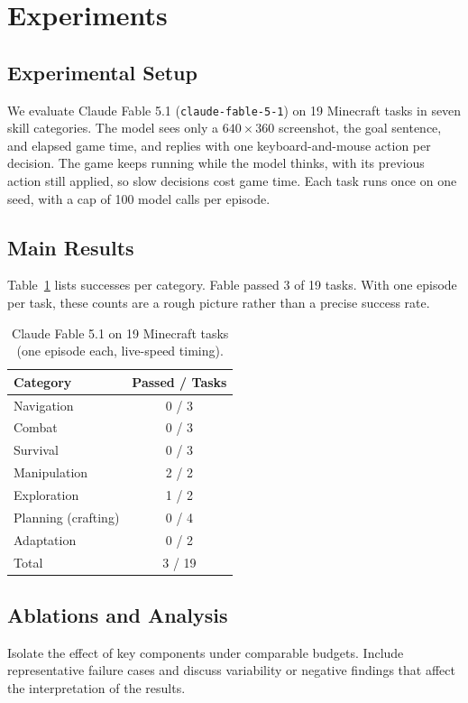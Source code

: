 \section{Experiments}
\label{sec:experiments}
\subsection{Experimental Setup}
We evaluate Claude Fable 5.1 (\texttt{claude-fable-5-1}) on 19 Minecraft
tasks in seven skill categories. The model sees only a $640\times360$
screenshot, the goal sentence, and elapsed game time, and replies with one
keyboard-and-mouse action per decision. The game keeps running while the
model thinks, with its previous action still applied, so slow decisions
cost game time. Each task runs once on one seed, with a cap of 100 model
calls per episode.

\subsection{Main Results}
Table~\ref{tab:results} lists successes per category. Fable passed
3 of 19 tasks. With one episode per task, these counts are a rough
picture rather than a precise success rate.

\begin{table}[t]
  \centering
  \caption{Claude Fable 5.1 on 19 Minecraft tasks (one episode each,
  live-speed timing).}
  \label{tab:results}
  \begin{tabular}{lc}
    \toprule
    Category & Passed / Tasks \\
    \midrule
    Navigation   & 0 / 3 \\
    Combat       & 0 / 3 \\
    Survival     & 0 / 3 \\
    Manipulation & 2 / 2 \\
    Exploration  & 1 / 2 \\
    Planning (crafting) & 0 / 4 \\
    Adaptation   & 0 / 2 \\
    \midrule
    Total        & 3 / 19 \\
    \bottomrule
  \end{tabular}
\end{table}

\subsection{Ablations and Analysis}
Isolate the effect of key components under comparable budgets.
Include representative failure cases and discuss variability or
negative findings that affect the interpretation of the results.
